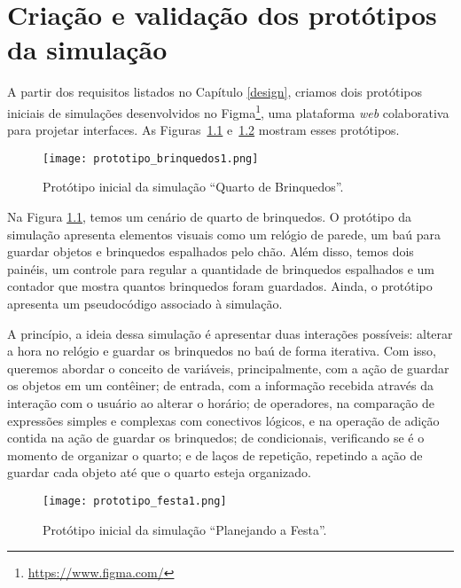
\chapter{Criação e validação dos protótipos da simulação}
\label{prototypes}

A partir dos requisitos listados no Capítulo \ref{design}, criamos dois protótipos iniciais de simulações desenvolvidos no Figma\footnote{\url{https://www.figma.com/}}, uma plataforma \textit{web} colaborativa para projetar interfaces. As Figuras~\ref{figure:brinquedos1} e~\ref{figure:festa1} mostram esses protótipos.

\begin{figure}[h!]
    \centering
    \texttt{[image: prototipo\_brinquedos1.png]}
    \caption{Protótipo inicial da simulação \enquote{Quarto de Brinquedos}.}
    \label{figure:brinquedos1}
\end{figure}

Na Figura \ref{figure:brinquedos1}, temos um cenário de quarto de brinquedos. O protótipo da simulação apresenta elementos visuais como um relógio de parede, um baú para guardar objetos e brinquedos espalhados pelo chão. Além disso, temos dois painéis, um controle para regular a quantidade de brinquedos espalhados e um contador que mostra quantos brinquedos foram guardados. Ainda, o protótipo apresenta um pseudocódigo associado à simulação.

A princípio, a ideia dessa simulação é apresentar duas interações possíveis: alterar a hora no relógio e guardar os brinquedos no baú de forma iterativa. Com isso, queremos abordar o conceito de variáveis, principalmente, com a ação de guardar os objetos em um contêiner; de entrada, com a informação recebida através da interação com o usuário ao alterar o horário; de operadores, na comparação de expressões simples e complexas com conectivos lógicos, e na operação de adição contida na ação de guardar os brinquedos; de condicionais, verificando se é o momento de organizar o quarto; e de laços de repetição, repetindo a ação de guardar cada objeto até que o quarto esteja organizado.

\begin{figure}[h!]
    \centering
    \texttt{[image: prototipo\_festa1.png]}
    \caption{Protótipo inicial da simulação \enquote{Planejando a Festa}.}
    \label{figure:festa1}
\end{figure}

